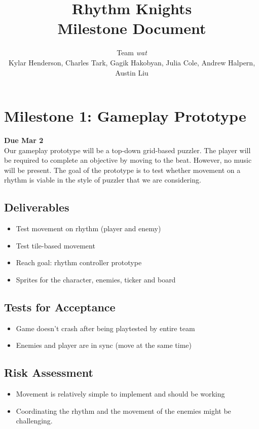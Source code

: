 \documentclass[]{article}
\begin{document}
\title{\textbf{Rhythm Knights} \\ Milestone Document}
\author{Team \emph{wat} \\
  \small{Kylar Henderson, Charles Tark, 
    Gagik Hakobyan, Julia Cole, Andrew Halpern, Austin Liu}}
\date{} %
\maketitle

\section*{Milestone 1: Gameplay Prototype}
\noindent\textbf{Due Mar 2}\\
Our gameplay prototype will be a top-down grid-based puzzler. The
player will be required to complete an objective by moving to the
beat. However, no music will be present. The goal of the prototype is
to test whether movement on a rhythm is viable in the style of puzzler
that we are considering.
\subsection*{Deliverables}
\begin{itemize}
\item Test movement on rhythm (player and enemy)
\item Test tile-based movement
\item Reach goal: rhythm controller prototype
\item Sprites for the character, enemies, ticker and board
\end{itemize}
\subsection*{Tests for Acceptance}
\begin{itemize}
\item Game doesn't crash after being playtested by entire team
\item Enemies and player are in sync (move at the same time)
\end{itemize}
\subsection*{Risk Assessment}
\begin{itemize}
\item Movement is relatively simple to implement and should be working
\item Coordinating the rhythm and the movement of the enemies might be 
  challenging.
\end{itemize}
\end{document}
